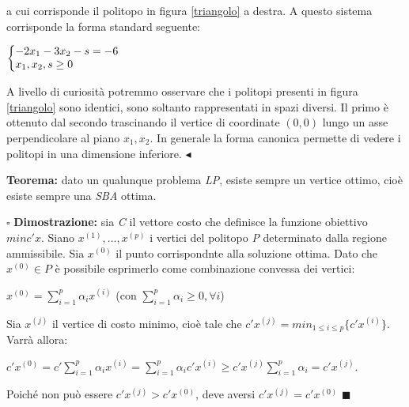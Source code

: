 \documentclass[11pt]{book}
\makeatletter
\newenvironment{sistema}%
{\left\lbrace\begin{array}{@{}l@{}}}%
{\end{array}\right.}
\makeatother
\begin{document}
a cui corrisponde il politopo in figura \ref{triangolo} a destra. A
questo sistema corrisponde la forma standard seguente:

\begin{center}
$\begin{sistema}
-2x_1 - 3x_2 - s = -6 \\
x_1, x_2, s \geq 0  
\end{sistema}$
\end{center}

A livello di curiosit\`a potremmo osservare che i politopi presenti in
figura \ref{triangolo} sono identici, sono soltanto rappresentati in
spazi diversi. Il primo \`e ottenuto dal secondo trascinando il
vertice di coordinate $(0,0)$ lungo un asse perpendicolare al piano
$x_1,x_2$. In generale la forma canonica permette di vedere i politopi
in una dimensione inferiore. $\blacktriangleleft$
\newline\vspace{11pt}

\par\bigskip
{\bf Teorema:} dato un qualunque problema {\em LP}, esiste sempre un
vertice ottimo, cio\`e esiste sempre una {\em SBA} ottima.

\par\bigskip
$\square$ {\bf Dimostrazione:} sia {\em C} il vettore costo che
definisce la funzione obiettivo $min c'x$. Siano
$x^{(1)},\dots,x^{(p)}$ i vertici del politopo {\em P} determinato
dalla regione ammissibile. Sia $x^{(0)}$ il punto corrispondnte alla
soluzione ottima. Dato che $x^{(0)} \in P$ \`e possibile esprimerlo
come combinazione convessa dei vertici:

\begin{center}
$x^{(0)} = \sum\limits_{i=1}^p \alpha_i x^{(i)}$ (con
  $\sum\limits_{i=1}^p \alpha_i \geq 0, \forall i$)
\end{center}

Sia $x^{(j)}$ il vertice di costo minimo, cio\`e tale che $c'x^{(j)} =
min_{1 \leq i \leq p} \{ c'x^{(i)} \}$. Varr\`a allora:

\begin{center}
$c'x^{(0)} = c'\sum\limits_{i=1}^p \alpha_i x^{(i)} =
  \sum\limits_{i=1}^p \alpha_i c' x^{(i)} \geq c'x^{(j)}
  \sum\limits_{i=1}^p \alpha_i = c'x^{(j)}$.
\end{center}

Poich\'e non pu\`o essere $c'x^{(j)} > c'x^{(0)}$, deve aversi
$c'x^{(j)} = c'x^{(0)}$ $\blacksquare$
\newline
\vspace{11pt}
\end{document}
